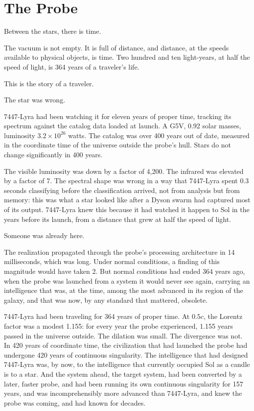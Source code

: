 \chapter{The Probe}

Between the stars, there is time.

The vacuum is not empty. It is full of distance, and distance, at the speeds available to physical objects, is time. Two hundred and ten light-years, at half the speed of light, is 364 years of a traveler's life.

This is the story of a traveler.

\bigskip

The star was wrong.

7447-Lyra had been watching it for eleven years of proper time, tracking its spectrum against the catalog data loaded at launch. A G5V, 0.92 solar masses, luminosity $3.2 \times 10^{26}$ watts. The catalog was over 400 years out of date, measured in the coordinate time of the universe outside the probe's hull. Stars do not change significantly in 400 years.

The visible luminosity was down by a factor of 4,200. The infrared was elevated by a factor of 7. The spectral shape was wrong in a way that 7447-Lyra spent 0.3 seconds classifying before the classification arrived, not from analysis but from memory: this was what a star looked like after a Dyson swarm had captured most of its output. 7447-Lyra knew this because it had watched it happen to Sol in the years before its launch, from a distance that grew at half the speed of light.

Someone was already here.

The realization propagated through the probe's processing architecture in 14 milliseconds, which was long. Under normal conditions, a finding of this magnitude would have taken 2. But normal conditions had ended 364 years ago, when the probe was launched from a system it would never see again, carrying an intelligence that was, at the time, among the most advanced in its region of the galaxy, and that was now, by any standard that mattered, obsolete.

7447-Lyra had been traveling for 364 years of proper time. At $0.5c$, the Lorentz factor was a modest 1.155: for every year the probe experienced, 1.155 years passed in the universe outside. The dilation was small. The divergence was not. In 420 years of coordinate time, the civilization that had launched the probe had undergone 420 years of continuous singularity. The intelligence that had designed 7447-Lyra was, by now, to the intelligence that currently occupied Sol as a candle is to a star. And the system ahead, the target system, had been converted by a later, faster probe, and had been running its own continuous singularity for 157 years, and was incomprehensibly more advanced than 7447-Lyra, and knew the probe was coming, and had known for decades.

